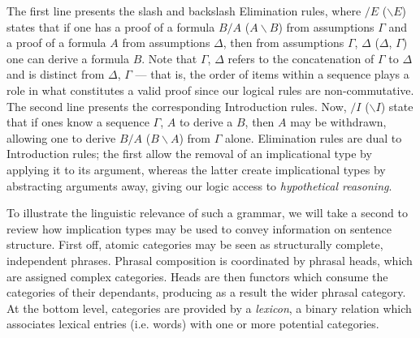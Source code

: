 The first line presents the slash and backslash Elimination rules, where $/E$ ($\backslash E$) states that if one has a proof of a formula $B/A$ ($A \backslash B$) from assumptions $\Gamma$ and a proof of a formula $A$ from assumptions $\Delta$, then from assumptions $\Gamma$, $\Delta$ ($\Delta$, $\Gamma$) one can derive a formula $B$.
Note that $\Gamma$, $\Delta$ refers to the concatenation of $\Gamma$ to $\Delta$ and is distinct from $\Delta$, $\Gamma$  --- that is, the order of items within a sequence plays a role in what constitutes a valid proof since our logical rules are non-commutative.
The second line presents the corresponding Introduction rules.
Now, $/I$ ($\backslash I$) state that if ones know a sequence $\Gamma$, $A$ to derive a $B$, then $A$ may be withdrawn, allowing one to derive $B/A$ ($B \backslash A$) from $\Gamma$ alone.
Elimination rules are dual to Introduction rules; the first allow the removal of an implicational type by applying it to its argument, whereas the latter create implicational types by abstracting arguments away, giving our logic access to \textit{hypothetical reasoning}.


To illustrate the linguistic relevance of such a grammar, we will take a second  to review how implication types may be used to convey information on sentence structure.
First off, atomic categories may be seen as structurally complete, independent phrases.
Phrasal composition is coordinated by phrasal heads, which are assigned complex categories.
Heads are then functors which consume the categories of their dependants, producing as a result the wider phrasal category.
At the bottom level, categories are provided by a \textit{lexicon}, a binary relation which associates lexical entries (i.e. words) with one or more potential categories.

